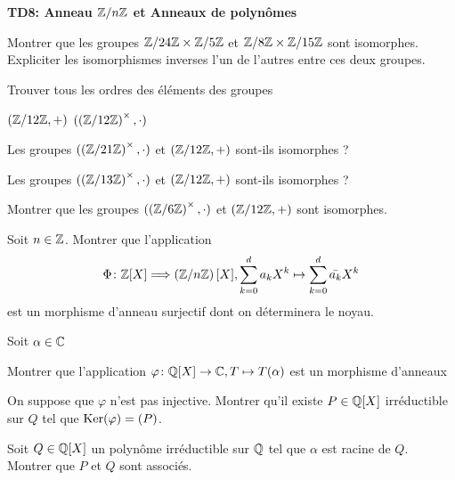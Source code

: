 \documentclass{report}
\begin{document}
\begin{center}
    \huge{\textbf{TD8: Anneau \(\mathbb{Z}/n\mathbb{Z}\) et Anneaux de polynômes}}
\end{center}

\begin{exo}
    Montrer que les groupes \(\mathbb{Z}/24\mathbb{Z}\times\mathbb{Z}/5\mathbb{Z}\) et \(\mathbb{Z}/8\mathbb{Z}\times\mathbb{Z}/15\mathbb{Z}\)
    sont isomorphes. Expliciter les isomorphismes inverses l'un de l'autres
    entre ces deux groupes.
\end{exo}

\begin{exo}
    Trouver tous les ordres des éléments des groupes
    \begin{enumerate}
        \itt \(\left(\mathbb{Z}/12\mathbb{Z}, +\right)\)
        \itt \((\left(\mathbb{Z}/12\mathbb{Z}\right)^{\times}, \cdot)\)
    \end{enumerate}
\end{exo}

\begin{exo}
    \begin{q}{1}
        Les groupes \((\left(\mathbb{Z}/21\mathbb{Z}\right)^\times,\cdot)\) et
        \(\left(\mathbb{Z}/12\mathbb{Z}, +\right)\) sont-ils isomorphes ?
    \end{q}
    \begin{q}{2}
        Les groupes \((\left(\mathbb{Z}/13\mathbb{Z}\right)^\times,\cdot)\) et
        \(\left(\mathbb{Z}/12\mathbb{Z}, +\right)\) sont-ils isomorphes ?
    \end{q}
    \begin{q}{3}
        Montrer que les groupes \((\left(\mathbb{Z}/6\mathbb{Z}\right)^\times,\cdot)\)
        et \(\left(\mathbb{Z}/12\mathbb{Z}, +\right)\) sont isomorphes.
    \end{q}
\end{exo}

\begin{exo}
    Soit \(n\in\mathbb{Z}\). Montrer que l'application
    \[\Phi\colon\mathbb{Z}[X]\Longrightarrow\left(\mathbb{Z}/n\mathbb{Z}\right)[X],
    \sum_{k=0}^da_kX^k\mapsto\sum_{k=0}^d\bar{a_k}X^k\]
    est un morphisme d'anneau surjectif dont on déterminera le noyau.
\end{exo}

\begin{exo}
    Soit \(\alpha\in\mathbb{C}\)
    \begin{q}{1}
        Montrer que l'application \(\varphi\colon\mathbb{Q}[X]\to\mathbb{C},T\mapsto T(\alpha)\)
        est un morphisme d'anneaux
    \end{q}
    \begin{q}{2}
        On suppose que \(\varphi\) n'est pas injective. Montrer qu'il existe \(P\in\mathbb{Q}[X]\)
        irréductible sur \(Q\) tel que \(\operatorname{Ker}(\varphi)=(P)\).
    \end{q}
    \begin{q}{3}
        Soit \(Q\in\mathbb{Q}[X]\) un polynôme irréductible sur \(\mathbb{Q}\) tel que \(\alpha\) est
        racine de \(Q\). Montrer que \(P\) et \(Q\) sont associés.
    \end{q}
\end{exo}
\end{document}
